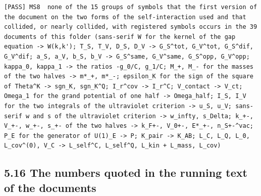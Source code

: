 \documentclass[
  10pt,
]{article}
\begin{document}
\begin{verbatim}
[PASS] MS8  none of the 15 groups of symbols that the first version of the document on the two forms of the self-interaction used and that collided, or nearly collided, with registered symbols occurs in the 39 documents of this folder (sans-serif W for the kernel of the gap equation -> W(k,k'); T_S, T_V, D_S, D_V -> G_S^tot, G_V^tot, G_S^dif, G_V^dif; a_S, a_V, b_S, b_V -> G_S^same, G_V^same, G_S^opp, G_V^opp; kappa_0, kappa_1 -> the ratios -g_0/C, g_1/C; M_+, M_- for the masses of the two halves -> m*_+, m*_-; epsilon_K for the sign of the square of Theta^K -> sgn_K, sgn_K^Q; I_r^cov -> I_r^C; V_contact -> V_ct; Omega_1 for the grand potential of one half -> Omega_half; I_S, I_V for the two integrals of the ultraviolet criterion -> u_S, u_V; sans-serif w and s of the ultraviolet criterion -> w_infty, s_Delta; k_+-, V_+-, w_+-, s_+- of the two halves -> k_F+-, V_0+-, E*_+-, n_S+-^vac; P_E for the generator of U(1)_E -> P; K_pair -> K_AB; L_C, L_Q, L_0, L_cov^(0), V_C -> L_self^C, L_self^Q, L_kin + L_mass, L_cov)
\end{verbatim}

\hypertarget{the-numbers-quoted-in-the-running-text-of-the-documents}{%
\subsection{5.16 The numbers quoted in the running text of the
documents}\label{the-numbers-quoted-in-the-running-text-of-the-documents}}
\end{document}
